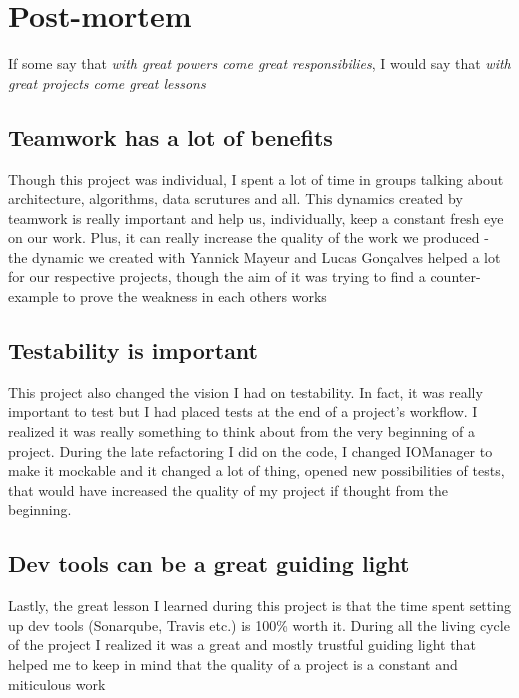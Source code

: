 \documentclass[11pt]{article}
\begin{document}
\section{Post-mortem}
If some say that \textit{with great powers come great responsibilies}, I would say that \textit{with great projects come great lessons}

\subsection{Teamwork has a lot of benefits}
Though this project was individual, I spent a lot of time in groups talking about architecture, algorithms, data scrutures and all. This dynamics created by teamwork is really important and help us, individually, keep a constant fresh eye on our work. Plus, it can really increase the quality of the work we produced - the dynamic we created with Yannick Mayeur and Lucas Gonçalves helped a lot for our respective projects, though the aim of it was trying to find a counter-example to prove the weakness in each others works

\subsection{Testability is important}
This project also changed the vision I had on testability. In fact, it was really important to test but I had placed tests at the end of a project's workflow. I realized it was really something to think about from the very beginning of a project. During the late refactoring I did on the code, I changed IOManager to make it mockable and it changed a lot of thing, opened new possibilities of tests, that would have increased the quality of my project if thought from the beginning.

\subsection{Dev tools can be a great guiding light}
Lastly, the great lesson I learned during this project is that the time spent setting up dev tools (Sonarqube, Travis etc.) is 100\% worth it. During all the living cycle of the project I realized it was a great and mostly trustful guiding light that helped me to keep in mind that the quality of a project is a constant and miticulous work
\end{document}
